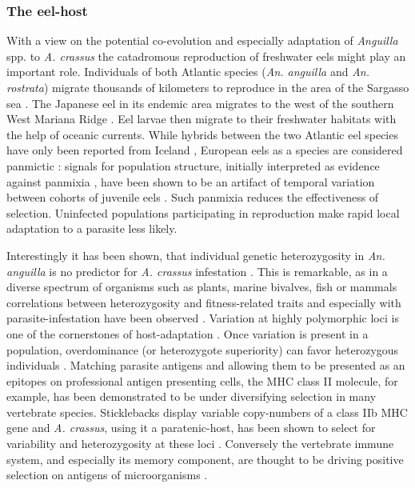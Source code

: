 \subsubsection{The eel-host}
\label{sec:eel-host}

With a view on the potential co-evolution and especially adaptation of
\textit{Anguilla} spp. to \textit{A. crassus} the catadromous
reproduction of freshwater eels might play an important
role. Individuals of both Atlantic species (\textit{An. anguilla} and
\textit{An. rostrata}) migrate thousands of kilometers to reproduce in
the area of the Sargasso sea \cite{pmid19779192}. The Japanese eel in
its endemic area migrates to the west of the southern West Mariana
Ridge \cite{pmid20735676}. Eel larvae then migrate to their freshwater
habitats with the help of oceanic currents. While hybrids between the
two Atlantic eel species have only been reported from Iceland
\cite{pmid21299662}, European eels as a species are considered
panmictic \cite{pmid20735687}: signals for population structure,
initially interpreted as evidence against panmixia
\cite{pmid11234011}, have been shown to be an artifact of temporal
variation between cohorts of juvenile eels \cite{pmid19417764,
  pmid21299662, pmid16024374}. Such panmixia reduces the effectiveness
of selection. Uninfected populations participating in reproduction
make rapid local adaptation to a parasite less likely.

Interestingly it has been shown, that individual genetic
heterozygosity in \textit{An. anguilla} is no predictor for
\textit{A. crassus} infestation \cite{pmid19840264}. This is
remarkable, as in a diverse spectrum of organisms such as plants,
marine bivalves, fish or mammals correlations between heterozygosity
and fitness-related traits and especially with parasite-infestation
have been observed \cite{pmid16262866,pmid18398424}. Variation at
highly polymorphic loci is one of the cornerstones of host-adaptation
\cite{pmid20078764}. Once variation is present in a population,
overdominance (or heterozygote superiority) can favor heterozygous
individuals \cite{pmid19129114,pmid17603099}. Matching parasite
antigens and allowing them to be presented as an epitopes on
professional antigen presenting cells, the MHC class II molecule, for
example, has been demonstrated to be under diversifying selection in
many vertebrate species. Sticklebacks display variable copy-numbers of
a class IIb MHC gene and \textit{A. crassus}, using it a
paratenic-host, has been shown to select for variability and
heterozygosity at these loci \cite{wegner_parasite_2003}. Conversely
the vertebrate immune system, and especially its memory component, are
thought to be driving positive selection on antigens of microorganisms
\cite{conway_measuring_2002}.

